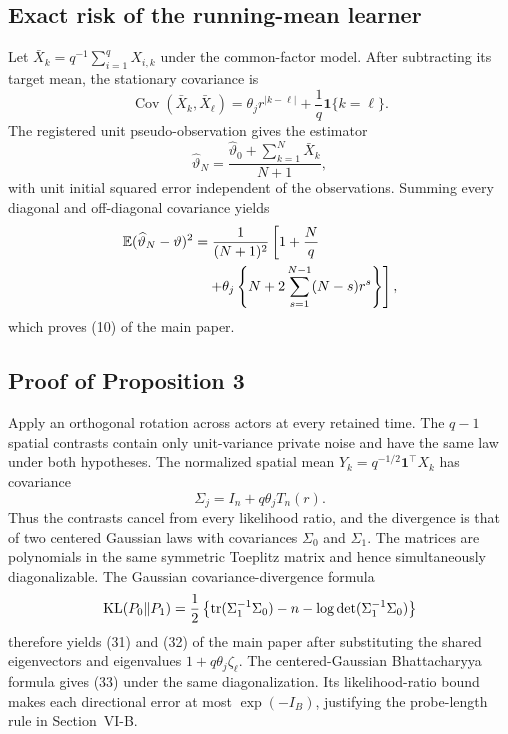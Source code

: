 \subsection{Exact risk of the running-mean learner}
Let $\bar X_k=q^{-1}\sum_{i=1}^qX_{i,k}$ under the common-factor model.
After subtracting its target mean, the stationary covariance is
\begin{equation}
\operatorname{Cov}(\bar X_k,\bar X_\ell)
=\theta_jr^{|k-\ell|}+\frac{1}{q}\mathbf 1\{k=\ell\}.
\label{eq:mean-observation-covariance-supp}
\end{equation}
The registered unit pseudo-observation gives the estimator
\begin{equation}
\widehat\vartheta_N=\frac{\widehat\vartheta_0+\sum_{k=1}^N\bar X_k}{N+1},
\end{equation}
with unit initial squared error independent of the observations.
Summing every diagonal and off-diagonal covariance yields
\begin{align}
\mathbb{E}(\widehat\vartheta_N-\vartheta)^2
&=\frac{1}{(N+1)^2}\left[1+\frac{N}{q}\right.\nonumber\\
&\left.\quad+\theta_j\left\{N+2\sum_{s=1}^{N-1}(N-s)r^s\right\}\right],
\end{align}
which proves (10) of the main paper.

\subsection{Proof of Proposition 3}
Apply an orthogonal rotation across actors at every retained time.
The $q-1$ spatial contrasts contain only unit-variance private noise and have the same law under both hypotheses.
The normalized spatial mean $Y_k=q^{-1/2}\bm 1^\top X_k$ has covariance
\begin{equation}
\Sigma_j=I_n+q\theta_jT_n(r).
\end{equation}
Thus the contrasts cancel from every likelihood ratio, and the divergence is that of two centered Gaussian laws with covariances $\Sigma_0$ and $\Sigma_1$.
The matrices are polynomials in the same symmetric Toeplitz matrix and hence simultaneously diagonalizable.
The Gaussian covariance-divergence formula
\begin{equation}
\operatorname{KL}(P_0\|P_1)=\frac12\left\{\operatorname{tr}(\Sigma_1^{-1}\Sigma_0)-n-\log\det(\Sigma_1^{-1}\Sigma_0)\right\}
\end{equation}
therefore yields (31) and (32) of the main paper after substituting the shared eigenvectors and eigenvalues $1+q\theta_j\zeta_\ell$.
The centered-Gaussian Bhattacharyya formula gives (33) under the same diagonalization.
Its likelihood-ratio bound makes each directional error at most $\exp(-I_B)$, justifying the probe-length rule in Section~VI-B.


